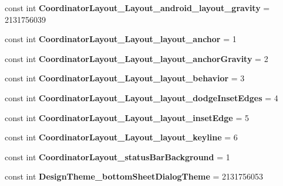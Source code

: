 \begin{DoxyCompactItemize}
const int {\bfseries Coordinator\+Layout\+\_\+\+Layout\+\_\+android\+\_\+layout\+\_\+gravity} = 2131756039
\item 
\mbox{\label{classst_delivery_1_1_resource_1_1_styleable_a9188048e80e1b362918ba8ee78c27484}} 
const int {\bfseries Coordinator\+Layout\+\_\+\+Layout\+\_\+layout\+\_\+anchor} = 1
\item 
\mbox{\label{classst_delivery_1_1_resource_1_1_styleable_a3533ce82b73ac63f0abfdfd98aafc504}} 
const int {\bfseries Coordinator\+Layout\+\_\+\+Layout\+\_\+layout\+\_\+anchor\+Gravity} = 2
\item 
\mbox{\label{classst_delivery_1_1_resource_1_1_styleable_a2d6140b367bc433ee8371b1b6bc80c69}} 
const int {\bfseries Coordinator\+Layout\+\_\+\+Layout\+\_\+layout\+\_\+behavior} = 3
\item 
\mbox{\label{classst_delivery_1_1_resource_1_1_styleable_a1c0b42b27ee36e1ed0695c191dc1e8ab}} 
const int {\bfseries Coordinator\+Layout\+\_\+\+Layout\+\_\+layout\+\_\+dodge\+Inset\+Edges} = 4
\item 
\mbox{\label{classst_delivery_1_1_resource_1_1_styleable_a54d395bd242c6ea8538a8f4bd18d65ce}} 
const int {\bfseries Coordinator\+Layout\+\_\+\+Layout\+\_\+layout\+\_\+inset\+Edge} = 5
\item 
\mbox{\label{classst_delivery_1_1_resource_1_1_styleable_ac6297c61c41db9c1cf5bbe8934799db8}} 
const int {\bfseries Coordinator\+Layout\+\_\+\+Layout\+\_\+layout\+\_\+keyline} = 6
\item 
\mbox{\label{classst_delivery_1_1_resource_1_1_styleable_a333f9f55e0a0e39bb1113b7e457a8159}} 
const int {\bfseries Coordinator\+Layout\+\_\+status\+Bar\+Background} = 1
\item 
\mbox{\label{classst_delivery_1_1_resource_1_1_styleable_af90fef3b7c2bc6a935df49f7fd237f07}} 
const int {\bfseries Design\+Theme\+\_\+bottom\+Sheet\+Dialog\+Theme} = 2131756053

\end{DoxyCompactItemize}
